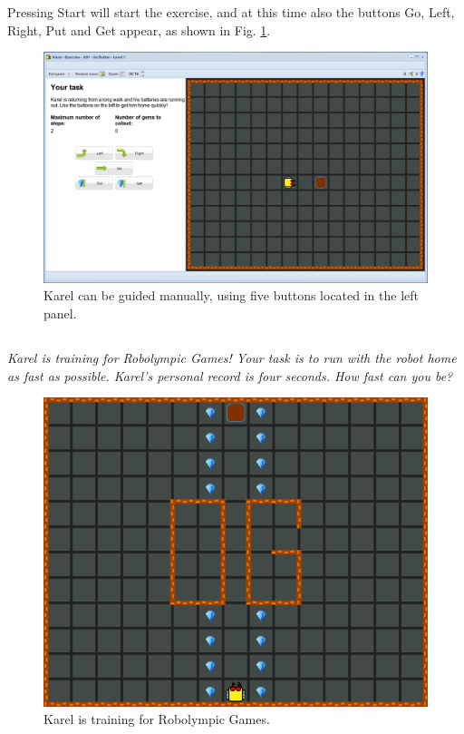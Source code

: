 \documentclass[article,A4,12pt]{llncs}
\begin{document}
\noindent
Pressing Start will start 
the exercise, and at this time also the buttons Go, Left, Right, Put and Get appear, 
as shown in Fig. \ref{fig:a01b}.


\begin{figure}[!ht]
\begin{center}
\includegraphics[height=0.4\textwidth]{imgk/a01b.png}
\end{center}
\vspace{-4mm}
\caption{Karel can be guided manually, using five buttons located in the left panel.}
\label{fig:a01b}
\vspace{-10mm}
\end{figure}

\newpage
\subsection{}

{\em Karel is training for Robolympic Games! Your task is to run with 
the robot home as fast as possible. Karel's personal record is four seconds. How fast can you be?}

\begin{figure}[!ht]
\begin{center}
\includegraphics[height=0.4\textwidth]{imgk/a02.png}
\end{center}
\vspace{-4mm}
\caption{Karel is training for Robolympic Games.}
\label{fig:a02}
\vspace{-4mm}
\end{figure}
\noindent
\end{document}
